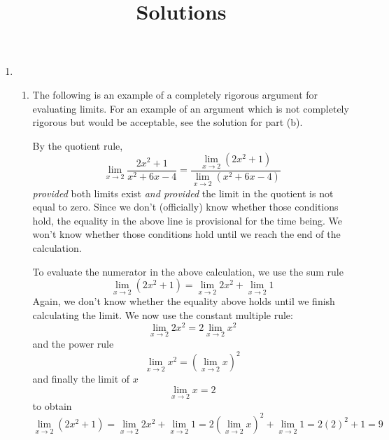 \documentclass{article}
\title{\commonPSTitleZeroOneSix\ Solutions}
\author{\commonAuthor}
\date{\commonPSTitleZeroOneSix}
\begin{document}
\maketitle
\begin{enumerate}
\item %
  \begin{enumerate}
  \item %
    The following is an example of a completely rigorous argument for
    evaluating limits.  For an example of an argument which is not completely
    rigorous but would be acceptable, see the solution for part (b).
    
    By the quotient rule,
    \begin{equation*}
      \lim_{x\to 2} \frac{2x^2+1}{x^2+6x-4}
      = \frac{\lim_{x\to 2} (2x^2+1)}{\lim_{x\to 2}(x^2+6x-4)}
    \end{equation*}
    \emph{provided} both limits exist \emph{and provided} the limit
    in the quotient is not equal to zero.  Since we don't (officially)
    know whether those conditions hold, the equality in the above line
    is provisional for the time being.  We won't know whether those conditions
    hold until we reach the end of the calculation.

    To evaluate the numerator in the above calculation, we use the sum rule
    \begin{equation*}
      \lim_{x\to 2} (2x^2+1) = \lim_{x\to 2} 2x^2 + \lim_{x\to 2} 1
    \end{equation*}
    Again, we don't know whether the equality above holds until we finish
    calculating the limit.  We now use the constant multiple rule:
    \begin{equation*}
      \lim_{x\to 2} 2x^2 = 2\lim_{x\to 2} x^2
    \end{equation*}
    and the power rule
    \begin{equation*}
      \lim_{x\to 2} x^2 = (\lim_{x\to 2} x)^2
    \end{equation*}
    and finally the limit of $x$
    \begin{equation*}
      \lim_{x\to 2} x = 2
    \end{equation*}
    to obtain
    \begin{equation*}
      \lim_{x\to 2} (2x^2+1) = \lim_{x\to 2} 2x^2 + \lim_{x\to 2} 1
      = 2\left(\lim_{x\to 2} x\right)^2 + \lim_{x\to 2} 1
      = 2(2)^2 + 1 = 9
    \end{equation*}
    

\end{enumerate}
\end{enumerate}
\end{document}
